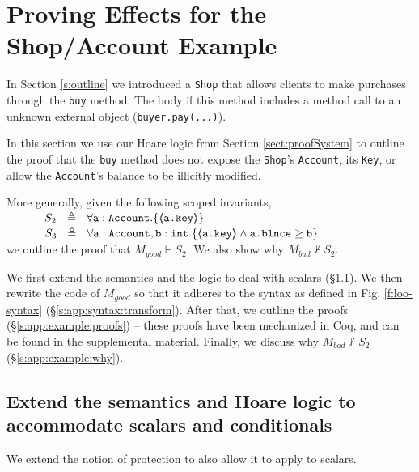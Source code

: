 \newcommand{\SPT}{~ \strut \hspace{.9cm}}

\section{  {Proving \Tamed Effects for the Shop/Account Example}}

\label{s:app:example}

In Section \ref{s:outline} we introduced a \verb|Shop| that allows clients to make purchases through the
\verb|buy| method.
The body if this method  includes a method call to an unknown external object (\verb|buyer.pay(...)|).

In this section  we use our Hoare logic from Section \ref{sect:proofSystem} to {outline the proof} that the \verb|buy| method
does not expose the \verb|Shop|'s  \verb|Account|, its \verb|Key|, or allow the \verb|Account|'s balance to be illicitly modified. 

More generally,   given  the following scoped invariants, \\  
$\strut  \SPSP  S_2\ \  \triangleq \ \ \TwoStatesN  {\prg{a}:\prg{Account}}  {\inside{\prg{a.key}}} $ 
 \\
$\strut  \SPSP  S_3\ \  \triangleq \ \ \TwoStatesN{ \prg{a}:\prg{Account},\prg{b}:\prg{int} } {\inside{\prg{a.key}} \wedge \prg{a.\balance} \geq \prg{b} } $ 
\\
 we {outline the proof} that $M_{good} \vdash S_2$.
{We  also show why $M_{bad} \not\vdash S_2$.}

{We first extend the semantics and the logic to deal with scalars (\S \ref{s:app:scalars}). 
We then rewrite the code of $M_{good}$ so that it adheres to the syntax as defined in Fig. \ref{f:loo-syntax} (\S \ref{s:app:syntax:transform}). 
After that, we outline the proofs (\S \ref{s:app:example:proofs}) -- these proofs have been mechanized in Coq, and can be found in the supplemental material. %
Finally, we discuss why $M_{bad} \not\vdash S_2$ (\S \ref{s:app:example:why}).}

\subsection{Extend the semantics and Hoare logic to accommodate scalars and conditionals}
\label{s:app:scalars}

{We extend the notion of protection to also allow it to apply to scalars. }

